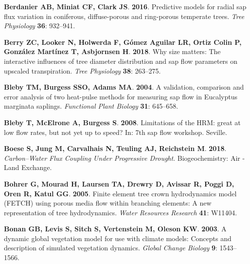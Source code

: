 \documentclass[11pt,twoside]{reedthesis}
\begin{document}
\hypertarget{ref-Berdanier2016}{}
\textbf{\textnormal{Berdanier AB}, \textnormal{Miniat CF},
\textnormal{Clark JS}}. \textbf{2016}. Predictive models for radial sap
flux variation in coniferous, diffuse-porous and ring-porous temperate
trees. \emph{Tree Physiology} \textbf{36}: 932--941.

\hypertarget{ref-berry2018}{}
\textbf{\textnormal{Berry ZC}, \textnormal{Looker N},
\textnormal{Holwerda F}, \textnormal{Gómez Aguilar LR},
\textnormal{Ortiz Colin P}, \textnormal{González Martínez T},
\textnormal{Asbjornsen H}}. \textbf{2018}. Why size matters: The
interactive influences of tree diameter distribution and sap flow
parameters on upscaled transpiration. \emph{Tree Physiology}
\textbf{38}: 263--275.

\hypertarget{ref-Bleby2004}{}
\textbf{\textnormal{Bleby TM}, \textnormal{Burgess SSO},
\textnormal{Adams MA}}. \textbf{2004}. A validation, comparison and
error analysis of two heat-pulse methods for measuring sap flow in
Eucalyptus marginata saplings. \emph{Functional Plant Biology}
\textbf{31}: 645--658.

\hypertarget{ref-Bleby2008}{}
\textbf{\textnormal{Bleby T}, \textnormal{McElrone A},
\textnormal{Burgess S}}. \textbf{2008}. Limitations of the HRM: great at
low flow rates, but not yet up to speed? In: 7th sap flow workshop.
Seville.

\hypertarget{ref-boese_carbonwater_2018}{}
\textbf{\textnormal{Boese S}, \textnormal{Jung M},
\textnormal{Carvalhais N}, \textnormal{Teuling AJ},
\textnormal{Reichstein M}}. \textbf{2018}. \emph{Carbon--Water Flux
Coupling Under Progressive Drought}. Biogeochemistry: Air - Land
Exchange.

\hypertarget{ref-Bohrer2005}{}
\textbf{\textnormal{Bohrer G}, \textnormal{Mourad H},
\textnormal{Laursen TA}, \textnormal{Drewry D}, \textnormal{Avissar R},
\textnormal{Poggi D}, \textnormal{Oren R}, \textnormal{Katul GG}}.
\textbf{2005}. Finite element tree crown hydrodynamics model (FETCH)
using porous media flow within branching elements: A new representation
of tree hydrodynamics. \emph{Water Resources Research} \textbf{41}:
W11404.

\hypertarget{ref-Bonan2003}{}
\textbf{\textnormal{Bonan GB}, \textnormal{Levis S}, \textnormal{Sitch
S}, \textnormal{Vertenstein M}, \textnormal{Oleson KW}}. \textbf{2003}.
A dynamic global vegetation model for use with climate models: Concepts
and description of simulated vegetation dynamics. \emph{Global Change
Biology} \textbf{9}: 1543--1566.
\end{document}
